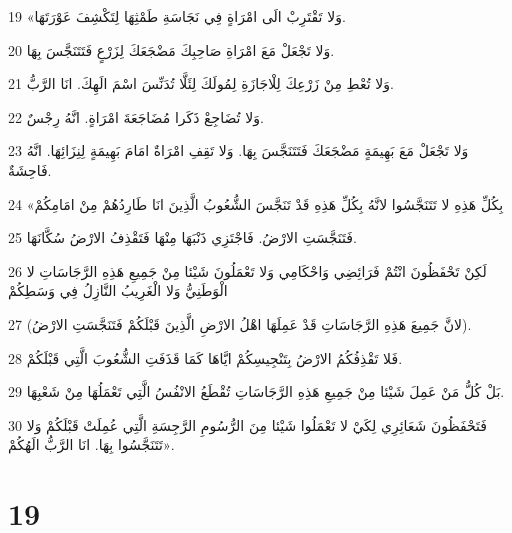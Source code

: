\par 19 «وَلا تَقْتَرِبْ الَى امْرَاةٍ فِي نَجَاسَةِ طَمْثِهَا لِتَكْشِفَ عَوْرَتَهَا.
\par 20 وَلا تَجْعَلْ مَعَ امْرَاةِ صَاحِبِكَ مَضْجَعَكَ لِزَرْعٍ فَتَتَنَجَّسَ بِهَا.
\par 21 وَلا تُعْطِ مِنْ زَرْعِكَ لِلْاجَازَةِ لِمُولَكَ لِئَلَّا تُدَنِّسَ اسْمَ الَهِكَ. انَا الرَّبُّ.
\par 22 وَلا تُضَاجِعْ ذَكَرا مُضَاجَعَةَ امْرَاةٍ. انَّهُ رِجْسٌ.
\par 23 وَلا تَجْعَلْ مَعَ بَهِيمَةٍ مَضْجَعَكَ فَتَتَنَجَّسَ بِهَا. وَلا تَقِفِ امْرَاةٌ امَامَ بَهِيمَةٍ لِنِزَائِهَا. انَّهُ فَاحِشَةٌ.
\par 24 «بِكُلِّ هَذِهِ لا تَتَنَجَّسُوا لانَّهُ بِكُلِّ هَذِهِ قَدْ تَنَجَّسَ الشُّعُوبُ الَّذِينَ انَا طَارِدُهُمْ مِنْ امَامِكُمْ
\par 25 فَتَنَجَّسَتِ الارْضُ. فَاجْتَزِي ذَنْبَهَا مِنْهَا فَتَقْذِفُ الارْضُ سُكَّانَهَا.
\par 26 لَكِنْ تَحْفَظُونَ انْتُمْ فَرَائِضِي وَاحْكَامِي وَلا تَعْمَلُونَ شَيْئا مِنْ جَمِيعِ هَذِهِ الرَّجَاسَاتِ لا الْوَطَنِيُّ وَلا الْغَرِيبُ النَّازِلُ فِي وَسَطِكُمْ
\par 27 (لانَّ جَمِيعَ هَذِهِ الرَّجَاسَاتِ قَدْ عَمِلَهَا اهْلُ الارْضِ الَّذِينَ قَبْلَكُمْ فَتَنَجَّسَتِ الارْضُ).
\par 28 فَلا تَقْذِفُكُمُ الارْضُ بِتَنْجِيسِكُمْ ايَّاهَا كَمَا قَذَفَتِ الشُّعُوبَ الَّتِي قَبْلَكُمْ.
\par 29 بَلْ كُلُّ مَنْ عَمِلَ شَيْئا مِنْ جَمِيعِ هَذِهِ الرَّجَاسَاتِ تُقْطَعُ الانْفُسُ الَّتِي تَعْمَلُهَا مِنْ شَعْبِهَا.
\par 30 فَتَحْفَظُونَ شَعَائِرِي لِكَيْ لا تَعْمَلُوا شَيْئا مِنَ الرُّسُومِ الرَّجِسَةِ الَّتِي عُمِلَتْ قَبْلَكُمْ وَلا تَتَنَجَّسُوا بِهَا. انَا الرَّبُّ الَهُكُمْ».

\chapter{19}

